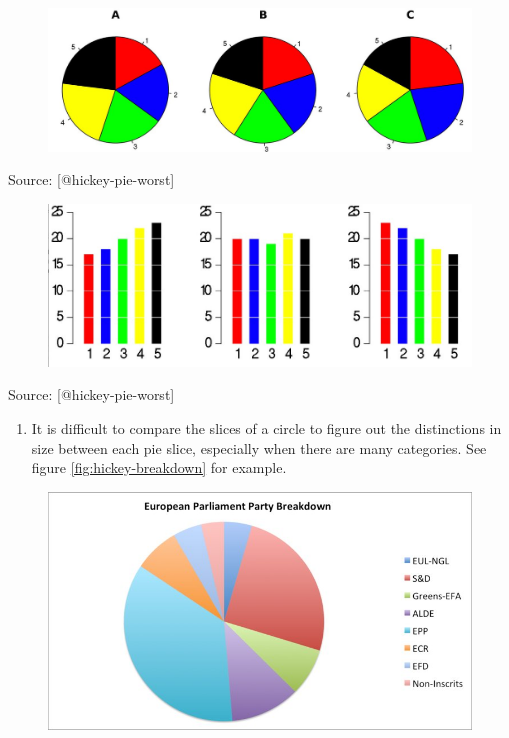\documentclass[]{book}
\providecommand{\tightlist}{%
  \setlength{\itemsep}{0pt}\setlength{\parskip}{0pt}}
\theoremstyle{definition}
\theoremstyle{definition}
\theoremstyle{definition}
\theoremstyle{remark}
\begin{document}
\begin{figure}
\centering
\includegraphics{images/hickey-before.jpg}
\caption{}
\end{figure}

Source: {[}@hickey-pie-worst{]}

\begin{figure}
\centering
\includegraphics{images/hickey-after.jpg}
\caption{}
\end{figure}

Source: {[}@hickey-pie-worst{]}

\begin{enumerate}
\def\labelenumi{\arabic{enumi}.}
\setcounter{enumi}{1}
\tightlist
\item
  It is difficult to compare the slices of a circle to figure out the
  distinctions in size between each pie slice, especially when there are
  many categories. See figure \ref{fig:hickey-breakdown} for example.
\end{enumerate}

\begin{figure}
\centering
\includegraphics{images/hickey-breakdown.jpg}
\caption{}
\end{figure}
\end{document}
